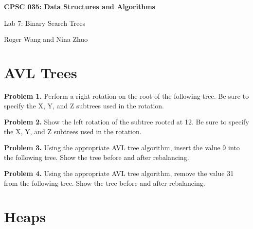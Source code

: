 \documentclass{article}
\begin{document}
\begin{center}
{\LARGE\textbf{CPSC 035: Data Structures and Algorithms}}

\vspace{1mm}
\large{Lab 7: Binary Search Trees}

\vspace{1mm}
\small{Roger Wang and Nina Zhuo}
\end{center}

\section{AVL Trees}

\noindent \textbf{Problem 1.} Perform a right rotation on the root of the following tree.  Be sure to specify the X, Y, and Z subtrees used in the rotation.

\vspace{2mm}

\vspace{2mm}

\noindent \textbf{Problem 2.} Show the left rotation of the subtree rooted at 12.  Be sure to specify the X, Y, and Z subtrees used in the rotation.


\vspace{2mm}

\vspace{2mm}

\noindent \textbf{Problem 3.} Using the appropriate AVL tree algorithm, insert the value 9 into the following tree.  Show the tree before and after rebalancing.


\vspace{2mm}

\vspace{2mm}

\noindent \textbf{Problem 4.} Using the appropriate AVL tree algorithm, remove the value 31 from the following tree.  Show the tree before and after rebalancing.


\vspace{2mm}

\vspace{2mm}

\section{Heaps}
\end{document}
